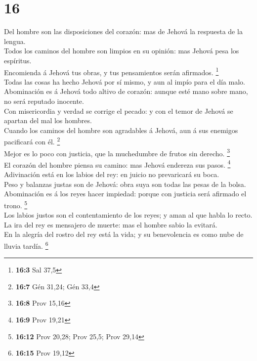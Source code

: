 \hypertarget{section-15}{%
\section{16}\label{section-15}}

 Del hombre son las disposiciones del corazón: mas de Jehová
la respuesta de la lengua.\\
 Todos los caminos del hombre son limpios en su opinión: mas
Jehová pesa los espíritus.\\
 Encomienda á Jehová tus obras, y tus pensamientos serán
afirmados. \footnote{\textbf{16:3} Sal 37,5}\\
 Todas las cosas ha hecho Jehová por sí mismo, y aun al
impío para el día malo.\\
 Abominación es á Jehová todo altivo de corazón: aunque esté
mano sobre mano, no será reputado inocente.\\
 Con misericordia y verdad se corrige el pecado: y con el
temor de Jehová se apartan del mal los hombres.\\
 Cuando los caminos del hombre son agradables á Jehová, aun
á sus enemigos pacificará con él. \footnote{\textbf{16:7} Gén 31,24; Gén
  33,4}\\
 Mejor es lo poco con justicia, que la muchedumbre de frutos
sin derecho. \footnote{\textbf{16:8} Prov 15,16}\\
 El corazón del hombre piensa su camino: mas Jehová endereza
sus pasos. \footnote{\textbf{16:9} Prov 19,21}\\
 Adivinación está en los labios del rey: en juicio no
prevaricará su boca.\\
 Peso y balanzas justas son de Jehová: obra suya son todas
las pesas de la bolsa.\\
 Abominación es á los reyes hacer impiedad: porque con
justicia será afirmado el trono. \footnote{\textbf{16:12} Prov 20,28;
  Prov 25,5; Prov 29,14}\\
 Los labios justos son el contentamiento de los reyes; y
aman al que habla lo recto.\\
 La ira del rey es mensajero de muerte: mas el hombre sabio
la evitará.\\
 En la alegría del rostro del rey está la vida; y su
benevolencia es como nube de lluvia tardía. \footnote{\textbf{16:15}
  Prov 19,12}\\
